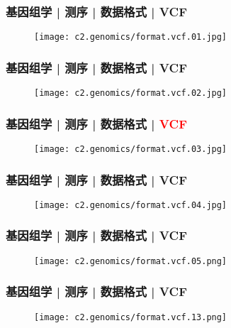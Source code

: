 \begin{frame}
  \frametitle{基因组学 | 测序 | 数据格式 | VCF}
  \begin{figure}
    \centering
    \texttt{[image: c2.genomics/format.vcf.01.jpg]}
  \end{figure}
\end{frame}
    
\begin{frame}
  \frametitle{基因组学 | 测序 | 数据格式 | VCF}
  \begin{figure}
    \centering
    \texttt{[image: c2.genomics/format.vcf.02.jpg]}
  \end{figure}
\end{frame}
    
\begin{frame}
  \frametitle{基因组学 | 测序 | 数据格式 | \textcolor{red}{VCF}}
  \begin{figure}
    \centering
    \texttt{[image: c2.genomics/format.vcf.03.jpg]}
  \end{figure}
\end{frame}

\begin{frame}
  \frametitle{基因组学 | 测序 | 数据格式 | VCF}
  \begin{figure}
    \centering
    \texttt{[image: c2.genomics/format.vcf.04.jpg]}
  \end{figure}
\end{frame}
    
\begin{frame}
  \frametitle{基因组学 | 测序 | 数据格式 | VCF}
  \begin{figure}
    \centering
    \texttt{[image: c2.genomics/format.vcf.05.png]}
  \end{figure}
\end{frame}
    
\begin{frame}
  \frametitle{基因组学 | 测序 | 数据格式 | VCF}
  \begin{figure}
    \centering
    \texttt{[image: c2.genomics/format.vcf.13.png]}
  \end{figure}
\end{frame}
    
